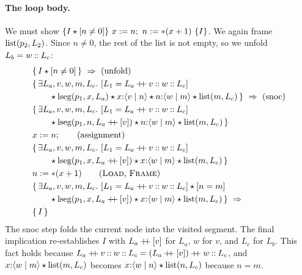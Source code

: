 \paragraph{The loop body.} We must show
$\{I\sep\pure{n\neq 0}\}\ x:=n;\ n:=\ast(x+1)\ \{I\}$. We again frame $\mathrm{list}(p_2,L_2)$. Since
$n\neq 0$, the rest of the list is not empty, so we unfold $L_b=w\mathbin{::} L_c$:
\begin{align*}
  &\{\,I\sep\pure{n\neq 0}\,\}\ \Rightarrow\ \text{(unfold)}\\
  &\{\,\exists L_a,v,w,m,L_c.\ \pure{L_1=L_a\app v\ld w\ld L_c}\\
  &\qquad\sep\lseg(p_1,x,L_a)\sep\nd{x}{v}{n}\sep\nd{n}{w}{m}\sep\lst(m,L_c)\,\}\ \Rightarrow\ \text{(snoc)}\\
  &\{\,\exists L_a,v,w,m,L_c.\ \pure{L_1=L_a\app v\ld w\ld L_c}\\
  &\qquad\sep\lseg(p_1,n,L_a\app[v])\sep\nd{n}{w}{m}\sep\lst(m,L_c)\,\}\\
  &x:=n;\qquad\text{(assignment)}\\
  &\{\,\exists L_a,v,w,m,L_c.\ \pure{L_1=L_a\app v\ld w\ld L_c}\\
  &\qquad\sep\lseg(p_1,x,L_a\app[v])\sep\nd{x}{w}{m}\sep\lst(m,L_c)\,\}\\
  &n:=\ast(x+1)\qquad\text{(\rn{Load}, \rn{Frame})}\\
  &\{\,\exists L_a,v,w,m,L_c.\ \pure{L_1=L_a\app v\ld w\ld L_c}\sep\pure{n=m}\\
  &\qquad\sep\lseg(p_1,x,L_a\app[v])\sep\nd{x}{w}{m}\sep\lst(m,L_c)\,\}\ \Rightarrow\\
  &\{\,I\,\}
\end{align*}
The snoc step folds the current node into the visited segment. The final implication re-establishes
$I$ with $L_a\mathbin{+\!\!+}[v]$ for $L_a$, $w$ for $v$, and $L_c$ for $L_b$. This fact holds because
$L_a\mathbin{+\!\!+} v\mathbin{::} w\mathbin{::} L_c=(L_a\mathbin{+\!\!+}[v])\mathbin{+\!\!+} w\mathbin{::} L_c$, and $x{:}\langle w\mid m\rangle\mathbin{\star}\mathrm{list}(m,L_c)$ becomes
$x{:}\langle w\mid n\rangle\mathbin{\star}\mathrm{list}(n,L_c)$ because $n=m$.

